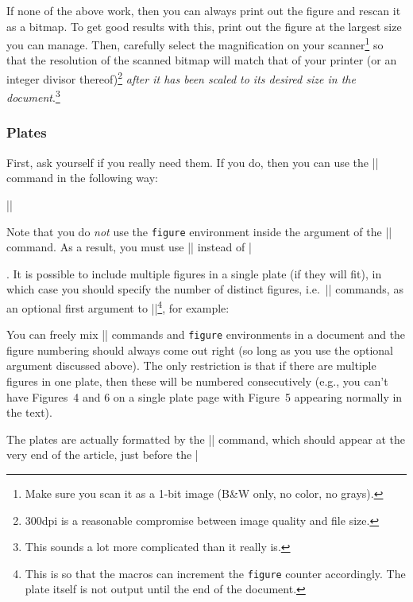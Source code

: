 \documentclass[guide]{rmaa}
\begin{document}
If none of the above work, then you can always print out the figure
and rescan it as a bitmap. To get good results with this, print out
the figure at the largest size you can manage. Then, carefully select
the magnification on your scanner\footnote{Make sure you scan it as a
  1-bit image (B\&W only, no color, no grays).} so that the resolution
of the scanned bitmap will match that of your printer (or an integer
divisor thereof)\footnote{300dpi is a reasonable compromise between
  image quality and file size.} \emph{after it has been scaled to its
  desired size in the document}.\footnote{This sounds a lot more
  complicated than it really is.}

\subsubsection{Plates}
\label{sec:plates}
First, ask yourself if you really need them. If you do, then you can
use the |\plate| command in the following way: 
\begin{Code}
      ||
\end{Code}
Note that you do \emph{not} use the \texttt{figure} environment inside
the argument of the |\plate| command. As a result, you must use
|\figcaption| instead of |\caption|. It is possible to include
multiple figures in a single plate (if they will fit), in which case
you should specify the number of distinct figures, i.e.\ |\figcaption|
commands, as an optional first argument to |\plate|\footnote{This is
  so that the macros can increment the \texttt{figure} counter
  accordingly. The plate itself is not output until the end of the
  document.}, for example:
\begin{Code}
  ||\\
  |  \vfil|\\
  |  \includegraphics[width=\textwidth]|\\
  |                  {example2.ps}|\\
  |  \figcaption{Caption to second figure|\\
  |     \label{fig:example2} } }|
\end{Code}
You can freely mix |\plate| commands and \texttt{figure} environments
in a document and the figure numbering should always come out right
(so long as you use the optional argument discussed above). The only
restriction is that if there are multiple figures in one plate, then
these will be numbered consecutively (e.g., you can't have Figures~4
and 6 on a single plate page with Figure~5 appearing normally in the
text).

The plates are actually formatted by the |\outputplates| command,
which should appear at the very end of the article, just before the
|
\end{document}
